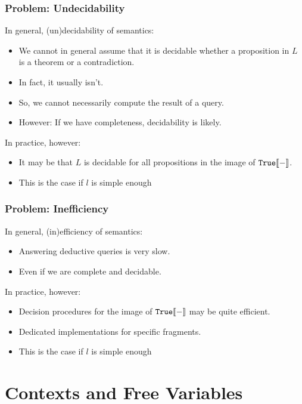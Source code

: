 \begin{frame}\frametitle{Problem: Undecidability}
In general, (un)decidability of semantics:
\begin{itemize}
\item We cannot in general assume that it is decidable whether a proposition in $L$ is a theorem or a contradiction.
\item In fact, it usually isn't.
\item So, we cannot necessarily compute the result of a query.
\item However: If we have completeness, decidability is likely.
\end{itemize}

In practice, however:
\begin{itemize}
\item It may be that $L$ is decidable for all propositions in the image of $\mathtt{True}\llbracket -\rrbracket$.
\item This is the case if $l$ is simple enough 
\end{itemize}
\end{frame}

\begin{frame}\frametitle{Problem: Inefficiency}
In general, (in)efficiency of semantics:
\begin{itemize}
\item Answering deductive queries is very slow.
\item Even if we are complete and decidable.
\end{itemize}

In practice, however:
\begin{itemize}
\item Decision procedures for the image of $\mathtt{True}\llbracket -\rrbracket$ may be quite efficient.
\item Dedicated implementations for specific fragments.
\item This is the case if $l$ is simple enough 
\end{itemize}
\end{frame}

\section{Contexts and Free Variables}

